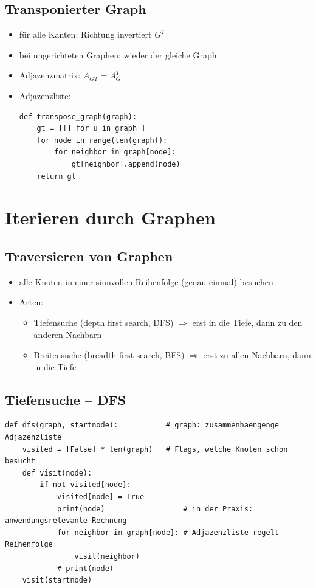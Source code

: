     \subsection*{Transponierter Graph}
    \begin{itemize}
        \item für alle Kanten: Richtung invertiert \hspace*{1cm} $G^T$
        \item bei ungerichteten Graphen: wieder der gleiche Graph
        \item Adjazenzmatrix: $A_{GT} = A_G^T$
        \item Adjazenzliste:
        \begin{verbatim}
def transpose_graph(graph):
    gt = [[] for u in graph ]
    for node in range(len(graph)):
        for neighbor in graph[node]:
            gt[neighbor].append(node)
    return gt
        \end{verbatim}
    \end{itemize}

    \section{Iterieren durch Graphen}
    \subsection*{Traversieren von Graphen}
    \begin{itemize}
        \item alle Knoten in einer sinnvollen Reihenfolge (genau einmal) besuchen
        \item Arten:
        \begin{itemize}
            \item Tiefensuche (depth first search, DFS) $\Rightarrow$ erst in die Tiefe, dann zu den anderen Nachbarn
            \item Breitensuche (breadth first search, BFS) $\Rightarrow$ erst zu allen Nachbarn, dann in die Tiefe
        \end{itemize}
    \end{itemize}

    \subsection*{Tiefensuche – DFS}
    \begin{verbatim}
def dfs(graph, startnode):           # graph: zusammenhaengenge Adjazenzliste
    visited = [False] * len(graph)   # Flags, welche Knoten schon besucht
    def visit(node):
        if not visited[node]:
            visited[node] = True
            print(node)                  # in der Praxis: anwendungsrelevante Rechnung
            for neighbor in graph[node]: # Adjazenzliste regelt Reihenfolge
                visit(neighbor)
            # print(node)
    visit(startnode)
    \end{verbatim}

